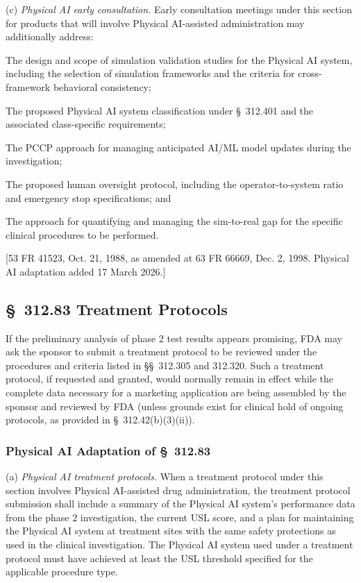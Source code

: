 \documentclass[11pt]{article}
\begin{document}
(c) \textit{Physical AI early consultation.} Early consultation meetings under this section for products that will involve Physical AI-assisted administration may additionally address:

\begin{description}[leftmargin=0.8cm,style=sameline]
\item[(i)] The design and scope of simulation validation studies for the Physical AI system, including the selection of simulation frameworks and the criteria for cross-framework behavioral consistency;
\item[(ii)] The proposed Physical AI system classification under \S~312.401 and the associated class-specific requirements;
\item[(iii)] The PCCP approach for managing anticipated AI/ML model updates during the investigation;
\item[(iv)] The proposed human oversight protocol, including the operator-to-system ratio and emergency stop specifications; and
\item[(v)] The approach for quantifying and managing the sim-to-real gap for the specific clinical procedures to be performed.
\end{description}

[53 FR 41523, Oct. 21, 1988, as amended at 63 FR 66669, Dec. 2, 1998. Physical AI adaptation added 17 March 2026.]

\subsection{\S~312.83 Treatment Protocols}

If the preliminary analysis of phase 2 test results appears promising, FDA may ask the sponsor to submit a treatment protocol to be reviewed under the procedures and criteria listed in \S\S~312.305 and 312.320. Such a treatment protocol, if requested and granted, would normally remain in effect while the complete data necessary for a marketing application are being assembled by the sponsor and reviewed by FDA (unless grounds exist for clinical hold of ongoing protocols, as provided in \S~312.42(b)(3)(ii)).

\subsubsection{Physical AI Adaptation of \S~312.83}

(a) \textit{Physical AI treatment protocols.} When a treatment protocol under this section involves Physical AI-assisted drug administration, the treatment protocol submission shall include a summary of the Physical AI system's performance data from the phase 2 investigation, the current USL score, and a plan for maintaining the Physical AI system at treatment sites with the same safety protections as used in the clinical investigation. The Physical AI system used under a treatment protocol must have achieved at least the USL threshold specified for the applicable procedure type.
\end{document}
